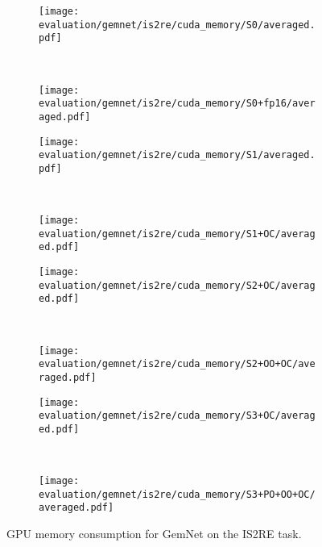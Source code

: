 \begin{figure}[H]

    \centering

    \begin{subfigure}[t]{0.45\textwidth}
        \centering
        \texttt{[image: evaluation/gemnet/is2re/cuda\_memory/S0/averaged.pdf]}
    \end{subfigure}%
    ~
    \begin{subfigure}[t]{0.45\textwidth}
        \centering
        \texttt{[image: evaluation/gemnet/is2re/cuda\_memory/S0+fp16/averaged.pdf]}
    \end{subfigure}

    \begin{subfigure}[t]{0.45\textwidth}
        \centering
        \texttt{[image: evaluation/gemnet/is2re/cuda\_memory/S1/averaged.pdf]}
    \end{subfigure}%
    ~
    \begin{subfigure}[t]{0.45\textwidth}
        \centering
        \texttt{[image: evaluation/gemnet/is2re/cuda\_memory/S1+OC/averaged.pdf]}
    \end{subfigure}

    \begin{subfigure}[t]{0.45\textwidth}
        \centering
        \texttt{[image: evaluation/gemnet/is2re/cuda\_memory/S2+OC/averaged.pdf]}
    \end{subfigure}%
    ~
    \begin{subfigure}[t]{0.45\textwidth}
        \centering
        \texttt{[image: evaluation/gemnet/is2re/cuda\_memory/S2+OO+OC/averaged.pdf]}
    \end{subfigure}

    \begin{subfigure}[t]{0.45\textwidth}
        \centering
        \texttt{[image: evaluation/gemnet/is2re/cuda\_memory/S3+OC/averaged.pdf]}
    \end{subfigure}%
    ~
    \begin{subfigure}[t]{0.45\textwidth}
        \centering
        \texttt{[image: evaluation/gemnet/is2re/cuda\_memory/S3+PO+OO+OC/averaged.pdf]}
    \end{subfigure}

    \caption{GPU memory consumption for GemNet on the IS2RE task.}
    
\end{figure}

